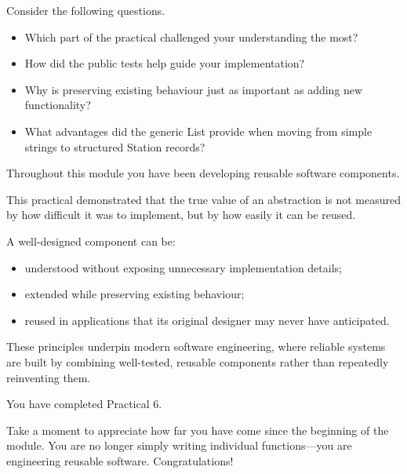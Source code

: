 \documentclass{csc2059practical}
\begin{document}
\begin{reflectionbox}

Consider the following questions.

\begin{itemize}
    \item Which part of the practical challenged your understanding the most?
    \item How did the public tests help guide your implementation?
    \item Why is preserving existing behaviour just as important as adding new functionality?
    \item What advantages did the generic List provide when moving from simple strings to structured Station records?
\end{itemize}

\end{reflectionbox}



\begin{importantnote}

Throughout this module you have been developing reusable software components.

This practical demonstrated that the true value of an abstraction is not measured by how difficult it was to implement, but by how easily it can be reused.

A well-designed component can be:

\begin{itemize}
    \item understood without exposing unnecessary implementation details;
    \item extended while preserving existing behaviour;
    \item reused in applications that its original designer may never have anticipated.
\end{itemize}

These principles underpin modern software engineering, where reliable systems are built by combining well-tested, reusable components rather than repeatedly reinventing them.

\end{importantnote}


You have completed Practical 6.

Take a moment to appreciate how far you have come since the beginning of the module. You are no longer simply writing individual functions—you are engineering reusable software.  Congratulations!
\end{document}
